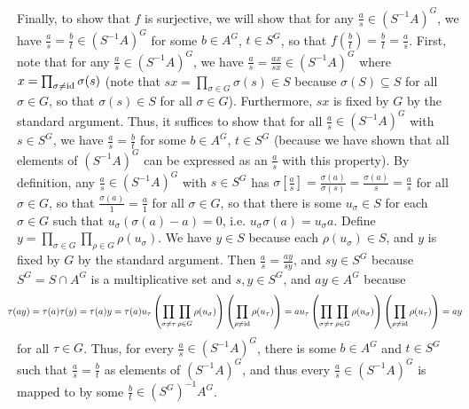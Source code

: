 \documentclass[11pt]{article}
\begin{document}
Finally, to show that $f$ is surjective, we will show that for any
$\frac{a}{s}\in (S^{-1}A)^G$, we have $\frac{a}{s}=\frac{b}{t}\in
(S^{-1}A)^G$ for some $b\in A^G$, $t\in S^G$, so that
$f(\frac{b}{t})=\frac{b}{t}=\frac{a}{s}$. First, note that for any
$\frac{a}{s}\in (S^{-1}A)^G$, we have $\frac{a}{s}=\frac{ax}{sx}\in
(S^{-1}A)^G$ where $x=\prod_{\sigma\neq\operatorname{id}}\sigma(s)$ (note that
$sx=\prod_{\sigma\in G}\sigma(s)\in S$ because $\sigma(S)\subseteq S$
for all $\sigma\in G$, so that $\sigma(s)\in S$ for all $\sigma\in
G$). Furthermore, $sx$ is fixed by $G$ by the standard argument. Thus,
it suffices to show that for all $\frac{a}{s}\in (S^{-1}A)^G$ with
$s\in S^G$, we have $\frac{a}{s}=\frac{b}{t}$ for some $b\in A^G$,
$t\in S^G$ (because we have shown that all elements of $(S^{-1}A)^G$
can be expressed as an $\frac{a}{s}$ with this property). By
definition, any $\frac{a}{s}\in (S^{-1}A)^G$ with $s\in S^G$ has
$\sigma[\frac{a}{s}]=\frac{\sigma(a)}{\sigma(s)}=\frac{\sigma(a)}{s}=\frac{a}{s}$
for all $\sigma\in G$, so that $\frac{\sigma(a)}{1}=\frac{a}{1}$
for all $\sigma\in G$, so that there is some $u_\sigma\in S$
for each $\sigma\in G$ such that $u_\sigma(\sigma(a)-a)=0$,
i.e. $u_\sigma\sigma(a)=u_\sigma a$. Define $y=\prod_{\sigma\in
G}\prod_{\rho\in G}\rho(u_\sigma)$. We have $y\in S$ because
each $\rho(u_\sigma)\in S$, and $y$ is fixed by $G$ by the standard
argument. Then $\frac{a}{s}=\frac{ay}{sy}$, and $sy\in S^G$ because $S^G=S\cap
A^G$ is a multiplicative set and $s,y\in S^G$, and $ay\in A^G$ because
\[\hskip-0.15in\tau(ay)=\tau(a)\tau(y)=\tau(a)y=\tau(a)u_\tau\left(\prod_{\sigma\neq\tau}\prod_{\rho\in
G}\rho(u_\sigma)\right)\left(\prod_{\rho\neq\id}\rho(u_\tau)\right)=au_\tau\left(\prod_{\sigma\neq\tau}\prod_{\rho\in
G}\rho(u_\sigma)\right)\left(\prod_{\rho\neq\id}\rho(u_\tau)\right)=ay\]
for all $\tau\in G$. Thus, for every $\frac{a}{s}\in (S^{-1}A)^G$, there
is some $b\in A^G$ and $t\in S^G$ such that $\frac{a}{s}=\frac{b}{t}$
as elements of $(S^{-1}A)^G$, and thus every $\frac{a}{s}\in (S^{-1}A)^G$
is mapped to by some $\frac{b}{t}\in(S^G)^{-1}A^G$.\\  

\pagebreak
\end{document}
